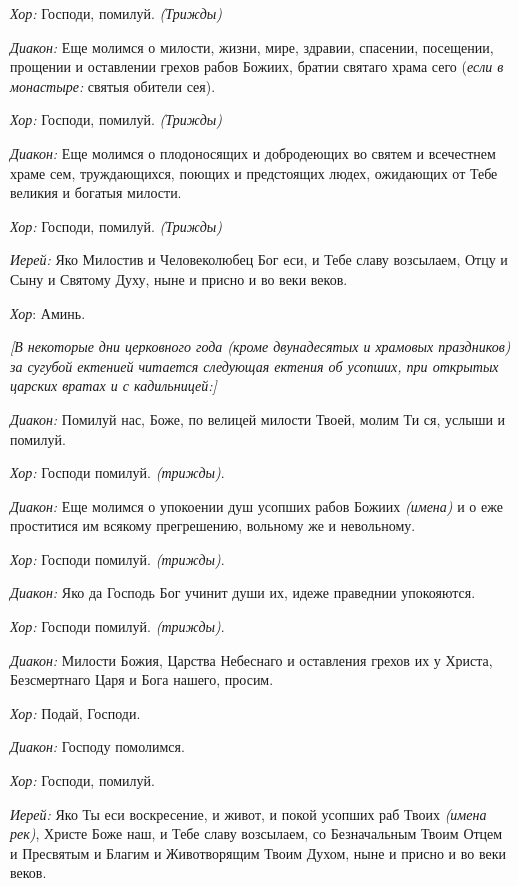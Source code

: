 \begin{mymulticols}
{\itshape Хор:} Господи, помилуй. {\itshape (Трижды)} 

{\itshape Диакон:} Еще молимся о милости, жизни, мире, здравии, спасении, посещении, прощении и оставлении грехов рабов Божиих, братии святаго храма сего ({\itshape если в монастыре:} святыя обители сея). 

{\itshape Хор:} Господи, помилуй. {\itshape (Трижды)} 

{\itshape Диакон:} Еще молимся о плодоносящих и добродеющих во святем и всечестнем храме сем, труждающихся, поющих и предстоящих людех, ожидающих от Тебе великия и богатыя милости.

{\itshape Хор:} Господи, помилуй. {\itshape (Трижды)} 

{\itshape Иерей:} Яко Милостив и Человеколюбец Бог еси, и Тебе славу возсылаем, Отцу и Сыну и Святому Духу, ныне и присно и во веки веков.

{\itshape Хор}: Аминь.


{\itshape [В некоторые дни церковного года (кроме двунадесятых и храмовых праздников) за сугубой ектенией читается следующая ектения об усопших, при открытых царских вратах и с кадильницей:]}

{\itshape Диакон:} Помилуй нас, Боже, по велицей милости Твоей, молим Ти ся, услыши и помилуй.

{\itshape Хор:} Господи помилуй. {\itshape (трижды)}. 

{\itshape Диакон:} Еще молимся о упокоении душ усопших рабов Божиих {\itshape (имена)} и о еже проститися им всякому прегрешению, вольному же и невольному.

{\itshape Хор:} Господи помилуй. {\itshape (трижды)}. 

{\itshape Диакон:} Яко да Господь Бог учинит души их, идеже праведнии упокояются.

{\itshape Хор:} Господи помилуй. {\itshape (трижды)}. 

{\itshape Диакон:} Милости Божия, Царства Небеснаго и оставления грехов их у Христа, Безсмертнаго Царя и Бога нашего, просим.

{\itshape Хор:} Подай, Господи.

{\itshape Диакон:} Господу помолимся.

{\itshape Хор:} Господи, помилуй.

{\itshape Иерей:} Яко Ты еси воскресение, и живот, и покой усопших раб Твоих {\itshape (имена рек)}, Христе Боже наш, и Тебе славу возсылаем, со Безначальным Твоим Отцем и Пресвятым и Благим и Животворящим Твоим Духом, ныне и присно и во веки веков.


\end{mymulticols}
